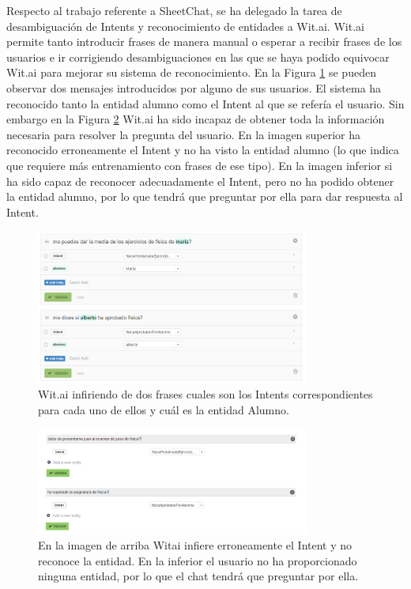 Respecto al trabajo referente a SheetChat, se ha delegado la tarea de desambiguación de Intents y reconocimiento de entidades a Wit.ai. Wit.ai permite tanto introducir frases de manera manual o esperar a recibir frases de los usuarios e ir corrigiendo desambiguaciones en las que se haya podido equivocar Wit.ai para mejorar su sistema de reconocimiento. En la Figura \ref{fig:WitaiInbox} se pueden observar dos mensajes introducidos por alguno de sus usuarios. El sistema ha reconocido tanto la entidad alumno como el Intent al que se refería el usuario. Sin embargo en la Figura \ref{fig:WitaiFallo} Wit.ai ha sido incapaz de obtener toda la información necesaria para resolver la pregunta del usuario. En la imagen superior ha reconocido erroneamente el Intent y no ha visto la entidad alumno (lo que indica que requiere más entrenamiento con frases de ese tipo). En la imagen inferior si ha sido capaz de reconocer adecuadamente el Intent, pero no ha podido obtener la entidad alumno, por lo que tendrá que preguntar por ella para dar respuesta al Intent.

\begin{figure}[htb]
	\centering
	\includegraphics[width=0.8\textwidth]{./figs/WitaiInbox.png}
	\caption{Wit.ai infiriendo de dos frases cuales son los Intents correspondientes para cada uno de ellos y cuál es la entidad Alumno.}
	\label{fig:WitaiInbox}
\end{figure}

\begin{figure}[htb]
	\centering
	\includegraphics[width=0.8\textwidth]{./figs/WitaiFallo.png}
	\caption{En la imagen de arriba Witai infiere erroneamente el Intent y no reconoce la entidad. En la inferior el usuario no ha proporcionado ninguna entidad, por lo que el chat tendrá que preguntar por ella.}
	\label{fig:WitaiFallo}
\end{figure}

